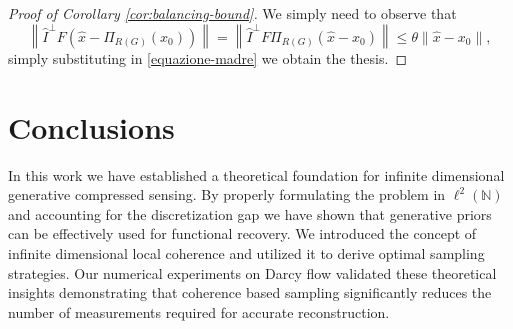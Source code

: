 \documentclass[a4paper,oneside]{amsart}
\begin{document}
    

\begin{proof}[Proof of Corollary \ref{cor:balancing-bound}]
    We simply need to observe that
    \begin{equation*}
        \left\|\hat{I}^\perp F(\hat{x}-\Pi_{R(G)}\left(x_0\right))\right\| = \left\|\hat{I}^\perp F\Pi_{R(G)}(\hat{x}-x_0)\right\| \leq \theta \| \hat{x} - x_0 \|,
    \end{equation*}
    simply substituting in \eqref{equazione-madre} we obtain the thesis.
\end{proof}
\section{Conclusions}\label{sec:conclusions} 
In this work we have established a theoretical foundation for infinite dimensional generative compressed sensing. By properly formulating the problem in $\ell^2(\mathbb{N})$ and accounting for the discretization gap we have shown that generative priors can be effectively used for functional recovery.
We introduced the concept of infinite dimensional local coherence and utilized it to derive optimal sampling strategies.
Our numerical experiments on Darcy flow validated these theoretical insights demonstrating that coherence based sampling significantly reduces the number of measurements required for accurate reconstruction.
\end{document}
